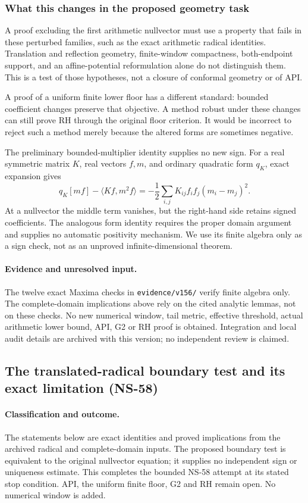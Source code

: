 \documentclass[11pt]{article}
\theoremstyle{remark}
\begin{document}
\subsubsection*{What this changes in the proposed geometry task}
A proof excluding the first arithmetic nullvector must use a property
that fails in these perturbed families, such as the exact arithmetic
radical identities. Translation and reflection geometry, finite-window
compactness, both-endpoint support, and an affine-potential reformulation
alone do not distinguish them. This is a test of those hypotheses,
not a closure of conformal geometry or of API.

A proof of a uniform finite lower floor has a different standard:
bounded coefficient changes preserve that objective. A method robust
under these changes can still prove RH through the original floor
criterion. It would be incorrect to reject such a method merely
because the altered forms are sometimes negative.

The preliminary bounded-multiplier identity supplies no new sign.
For a real symmetric matrix $K$, real vectors $f,m$, and ordinary
quadratic form $q_K$, exact expansion gives
\[
 q_K[mf]-\langle Kf,m^2f\rangle
 =-\frac12\sum_{i,j}K_{ij}f_if_j(m_i-m_j)^2.
\]
At a nullvector the middle term vanishes, but the right-hand side
retains signed coefficients. The analogous form identity requires
the proper domain argument and supplies no automatic positivity
mechanism. We use its finite algebra only as a sign check, not as
an unproved infinite-dimensional theorem.


\paragraph{Evidence and unresolved input.}
The twelve exact Maxima checks in \texttt{evidence/v156/} verify finite
algebra only. The complete-domain implications above rely on the cited
analytic lemmas, not on these checks. No new numerical window, tail metric,
effective threshold, actual arithmetic lower bound, API, G2 or RH proof is
obtained. Integration and local audit details are archived with this version;
no independent review is claimed.

\subsection{The translated-radical boundary test and its exact limitation (NS-58)}
\label{sec:ns58-boundary}

\paragraph{Classification and outcome.}
The statements below are exact identities and proved implications from
the archived radical and complete-domain inputs. The proposed boundary
test is equivalent to the original nullvector equation; it supplies no
independent sign or uniqueness estimate. This completes the bounded
NS-58 attempt at its stated stop condition. API, the uniform finite
floor, G2 and RH remain open. No numerical window is added.
\end{document}
